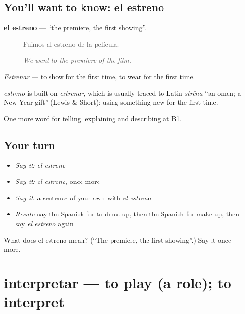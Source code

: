 \subsection*{You'll want to know: el estreno}
\textbf{el estreno} — \textquotedblleft{}the premiere, the first showing\textquotedblright{}.

\begin{quote}
Fuimos al estreno de la película.
\end{quote}

\begin{quote}
\emph{We went to the premiere of the film.}
\end{quote}

\emph{Estrenar} — to show for the first time, to wear for the first time.

\begin{cousinweb}
\emph{estreno} is built on \emph{estrenar}, which is usually traced to Latin \emph{strēna} \textquotedblleft{}an omen; a New Year gift\textquotedblright{} (Lewis \& Short): using something new for the first time.
\end{cousinweb}

\begin{grammarlens}[title={What you've built}]
One more word for telling, explaining and describing at B1.
\end{grammarlens}

\subsection*{Your turn}
\begin{itemize}
\raggedright
  \item \emph{Say it:} \emph{el estreno}
  \item \emph{Say it:} \emph{el estreno}, once more
  \item \emph{Say it:} a sentence of your own with \emph{el estreno}
  \item \emph{Recall:} say the Spanish for to dress up, then the Spanish for make-up, then say \emph{el estreno} again
\end{itemize}

\begin{tcolorbox}[breakable,colback=teal!4,colframe=teal!35!black,title={Before you move on}]
What does el estreno mean? (\textquotedblleft{}The premiere, the first showing\textquotedblright{}.) Say it once more.
\end{tcolorbox}
\section[interpretar]{interpretar — to play (a role); to interpret}

